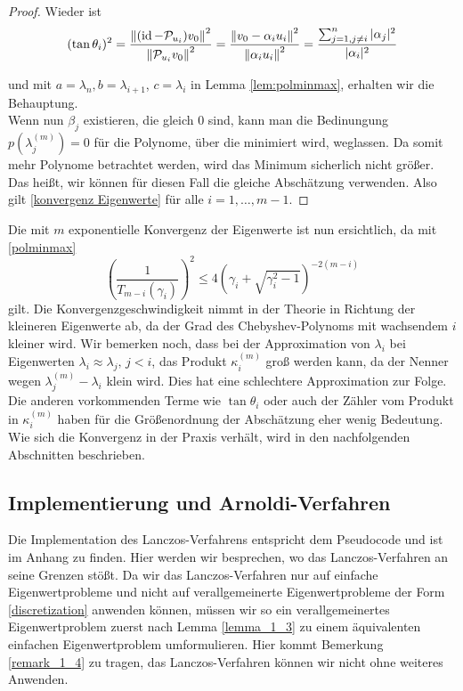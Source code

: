 \documentclass{article}
\begin{document}
\begin{theorem}
\begin{theorem}
\begin{proof}
	Wieder ist
	\begin{equation*}
		(\tan\theta_i)^2 = \frac{{\left \| (\operatorname{id} - \mathcal{P}_{u_i})v_0 \right \|}_{}^2}{{\left \|  \mathcal{P}_{u_i}v_0 \right \|}_{}^2} = \frac{{\left \| v_0 - \alpha_i u_i \right \|}_{}^2}{{\left \| \alpha_i u_i \right \|}_{}^2} = \frac{\sum_{\substack{j=1, j\neq i}}^{n} |\alpha_j|^2}{|\alpha_i|^2}
	\end{equation*}

	und  mit $a = \lambda_n, b= \lambda_{i+1}$, $c = \lambda_i$ in Lemma \ref{lem:polminmax}, erhalten wir die Behauptung.\\

	Wenn nun $\beta_j$ existieren, die gleich 0 sind, kann man die Bedinungung $p(\lambda_j^{(m)}) = 0$ für die Polynome, über die minimiert wird, weglassen.
	Da somit mehr Polynome betrachtet werden, wird das Minimum sicherlich nicht größer. Das heißt, wir können für diesen Fall die gleiche Abschätzung verwenden.
	Also gilt \eqref{konvergenz Eigenwerte} für alle $i = 1, \dots, m-1$.
	\end{proof}
\end{theorem}

Die mit $m$ exponentielle Konvergenz der Eigenwerte ist nun ersichtlich, da mit \eqref{polminmax}
\begin{equation*}
	\left(\frac{1}{T_{m-i}(\gamma_i)}\right)^2 \le 4 \left(\gamma_i + \sqrt{\gamma_i^2 -1}\right)^{-2(m-i)}
\end{equation*}
gilt. Die Konvergenzgeschwindigkeit nimmt in der Theorie in Richtung der kleineren Eigenwerte ab, da der Grad des Chebyshev-Polynoms mit wachsendem $i$ kleiner wird. Wir bemerken noch, dass bei der Approximation von $\lambda_i$ bei Eigenwerten $\lambda_i \approx \lambda_j, \, j < i$, das Produkt $\kappa_i^{(m)}$ groß werden kann, da der Nenner wegen $\lambda^{(m)}_j - \lambda_i$ klein wird. Dies hat eine schlechtere Approximation zur Folge. Die anderen vorkommenden Terme wie $\tan \theta_i$ oder auch der Zähler vom Produkt in $\kappa_i^{(m)}$ haben für die Größenordnung der Abschätzung eher wenig Bedeutung. Wie sich die Konvergenz in der Praxis verhält, wird in den nachfolgenden Abschnitten beschrieben.


\subsection{Implementierung und Arnoldi-Verfahren}

Die Implementation des Lanczos-Verfahrens entspricht dem Pseudocode und ist im Anhang zu finden. Hier werden wir besprechen, wo das Lanczos-Verfahren an seine Grenzen stößt. Da wir das Lanczos-Verfahren nur auf einfache Eigenwertprobleme und nicht auf verallgemeinerte Eigenwertprobleme der Form \ref{discretization} anwenden können, müssen wir so ein verallgemeinertes Eigenwertproblem zuerst nach Lemma \ref{lemma_1_3} zu einem äquivalenten einfachen Eigenwertproblem umformulieren. Hier kommt Bemerkung \ref{remark_1_4} zu tragen, das Lanczos-Verfahren können wir nicht ohne weiteres Anwenden.


\end{theorem}
\end{document}
